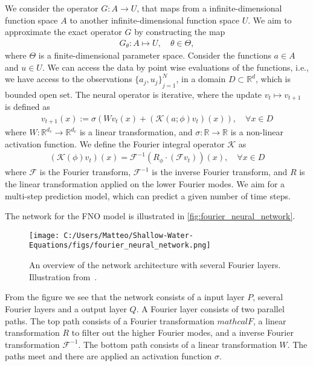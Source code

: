 We consider the operator $G: A \to U$, that maps from a infinite-dimensional function space $A$ to another infinite-dimensional function space $U$.
We aim to approximate the exact operator $G$ by constructing the map
\begin{align*}
    G_{\theta}: A \mapsto U, \quad \theta \in \Theta,
\end{align*} 
where $\Theta$ is a finite-dimensional parameter space.
Consider the functions $a \in A$ and $u \in U$.
We can access the data by point wise evaluations of the functions, i.e., we have access to the observations ${\{a_j, u_j \}}_{j=1}^N$, in a domain $D \subset \mathbb{R}^d$, which is bounded open set.
The neural operator is iterative, where the update $v_t \mapsto v_{t+1}$ is defined as
\begin{align}
    v_{t+1}(x) := \sigma \left( W v_t(x) + \left( \mathcal{K}(a;\phi)v_t \right) (x) \right), \quad \forall x \in D
\end{align}
where $W: \mathbb{R}^{d_v} \to \mathbb{R}^{d_v}$ is a linear transformation, and $\sigma: \mathbb{R} \to \mathbb{R}$ is a non-linear activation function.
We define the Fourier integral operator $\mathcal{K}$ as 
\begin{align}
    \left( \mathcal{K}(\phi)v_t \right) (x) = \mathcal{F}^{-1} \left( R_{\phi} \cdot (\mathcal{F}v_t ) \right)(x), \quad \forall x \in D
\end{align}
where $\mathcal{F}$ is the Fourier transform, $\mathcal{F}^{-1}$ is the inverse Fourier transform, and $R$ is the linear transformation applied on the lower Fourier modes. 
We aim for a multi-step prediction model, which can predict a given number of time steps.

The network for the FNO model is illustrated in \autoref{fig:fourier_neural_network}.
\begin{figure}[H]
    \centering
    \texttt{[image: C:/Users/Matteo/Shallow-Water-Equations/figs/fourier\_neural\_network.png]}
    \caption{An overview of the network architecture with several Fourier layers. Illustration from~\cite{FNO_2021}.}\label{fig:fourier_neural_network}
\end{figure}
From the figure we see that the network consists of a input layer $P$, several Fourier layers and a output layer $Q$.
A Fourier layer consists of two parallel paths. The top path consists of a Fourier transformation $mathcal{F}$, a linear transformation $R$ to filter out the higher Fourier modes, and a inverse Fourier transformation $\mathcal{F}^{-1}$.
The bottom path consists of a linear transformation $W$. 
The paths meet and there are applied an activation function $\sigma$.







